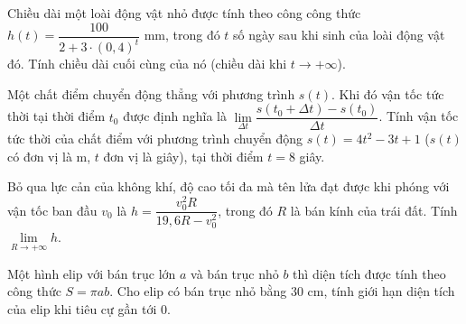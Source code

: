 \begin{bt}%
Chiều dài một loài động vật nhỏ được tính theo công công thức $h(t)=\dfrac{100}{2+3 \cdot  (0{,}4)^t}$ mm, trong đó $t$ số ngày sau khi sinh của loài động vật đó. Tính chiều dài  cuối cùng của nó (chiều dài khi $t \to +\infty$).
\end{bt}

\begin{bt}%
Một chất điểm chuyển động thẳng với phương trình $s(t)$. Khi đó vận tốc tức thời tại thời điểm $t_0$ được định nghĩa là $\displaystyle \lim \limits_{\Delta t} \dfrac{s(t_0+ \Delta t) - s(t_0)}{\Delta t}$. Tính vận tốc tức thời của chất điểm với phương trình chuyển động $s(t) = 4t^2-3t+1$ ($s(t)$ có đơn vị là m, $t$ đơn vị là giây), tại thời điểm $t=8$ giây. 
\end{bt}

\begin{bt}%
Bỏ qua lực cản của không khí, độ cao tối đa mà tên lửa đạt được khi phóng với vận tốc ban đầu $v_0$ là $h=\dfrac{v_0^2 R}{19{,}6 R-v_0^2}$, trong đó $R$ là bán kính của trái đất. Tính  $\displaystyle \lim \limits_{R \to +\infty} h$. 
\end{bt}


\begin{bt}%
Một hình elip với bán trục lớn $a$ và bán trục nhỏ $b$ thì diện tích được tính theo công thức $S=\pi ab$. Cho elip có bán trục nhỏ bằng $30$ cm, tính giới hạn diện tích của elip khi tiêu cự gần tới $0$.
\end{bt}





